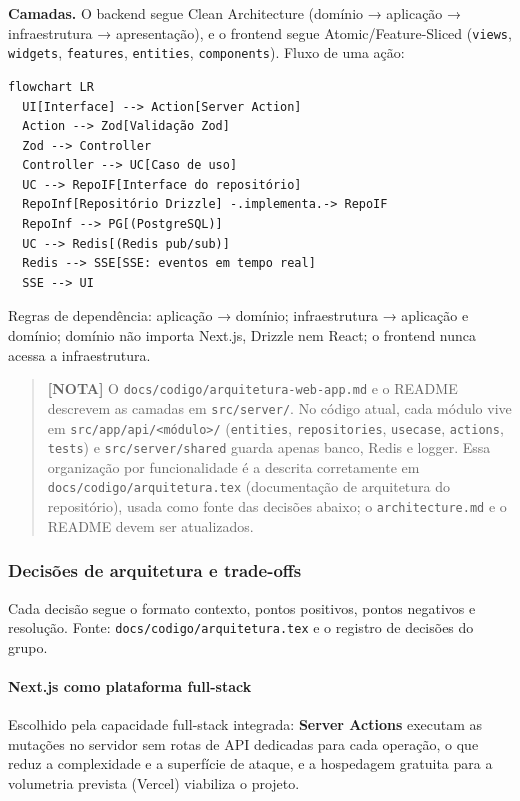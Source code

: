 \documentclass[
  brazilian,
  11pt,
]{article}
\begin{document}
\textbf{Camadas.} O backend segue Clean Architecture (domínio → aplicação → infraestrutura → apresentação), e o frontend segue Atomic/Feature-Sliced (\texttt{views}, \texttt{widgets}, \texttt{features}, \texttt{entities}, \texttt{components}). Fluxo de uma ação:

\begin{verbatim}
flowchart LR
  UI[Interface] --> Action[Server Action]
  Action --> Zod[Validação Zod]
  Zod --> Controller
  Controller --> UC[Caso de uso]
  UC --> RepoIF[Interface do repositório]
  RepoInf[Repositório Drizzle] -.implementa.-> RepoIF
  RepoInf --> PG[(PostgreSQL)]
  UC --> Redis[(Redis pub/sub)]
  Redis --> SSE[SSE: eventos em tempo real]
  SSE --> UI
\end{verbatim}

Regras de dependência: aplicação → domínio; infraestrutura → aplicação e domínio; domínio não importa Next.js, Drizzle nem React; o frontend nunca acessa a infraestrutura.

\begin{quote}
\textbf{{[}NOTA{]}} O \texttt{docs/codigo/arquitetura-web-app.md} e o README descrevem as camadas em \texttt{src/server/}. No código atual, cada módulo vive em \texttt{src/app/api/\textless{}módulo\textgreater{}/} (\texttt{entities}, \texttt{repositories}, \texttt{usecase}, \texttt{actions}, \texttt{tests}) e \texttt{src/server/shared} guarda apenas banco, Redis e logger. Essa organização por funcionalidade é a descrita corretamente em \texttt{docs/codigo/arquitetura.tex} (documentação de arquitetura do repositório), usada como fonte das decisões abaixo; o \texttt{architecture.md} e o README devem ser atualizados.
\end{quote}

\subsubsection{Decisões de arquitetura e trade-offs}\label{decisuxf5es-de-arquitetura-e-trade-offs}

Cada decisão segue o formato contexto, pontos positivos, pontos negativos e resolução. Fonte: \texttt{docs/codigo/arquitetura.tex} e o registro de decisões do grupo.

\paragraph{Next.js como plataforma full-stack}\label{next.js-como-plataforma-full-stack}

Escolhido pela capacidade full-stack integrada: \textbf{Server Actions} executam as mutações no servidor sem rotas de API dedicadas para cada operação, o que reduz a complexidade e a superfície de ataque, e a hospedagem gratuita para a volumetria prevista (Vercel) viabiliza o projeto.
\end{document}
